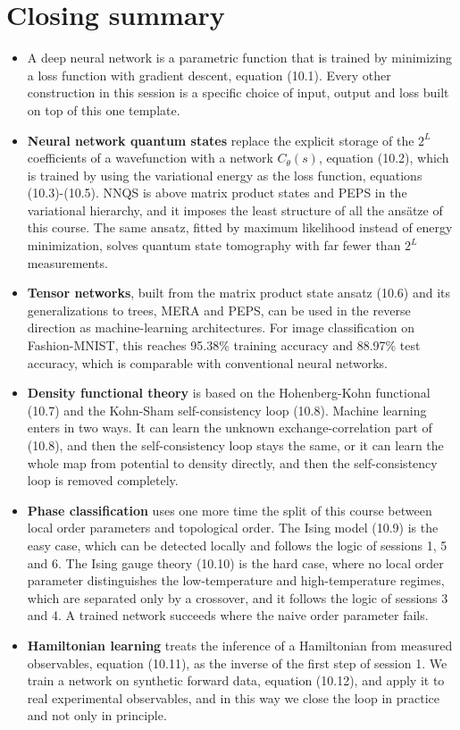 \section{Closing summary}

\begin{itemize}
\item A deep neural network is a parametric function that is trained by minimizing a loss function
  with gradient descent, equation (10.1). Every other construction in this session is a specific
  choice of input, output and loss built on top of this one template.
\item \textbf{Neural network quantum states} replace the explicit storage of the $2^L$ coefficients
  of a wavefunction with a network $C_\theta(s)$, equation (10.2), which is trained by using the
  variational energy as the loss function, equations (10.3)-(10.5). NNQS is above matrix product
  states and PEPS in the variational hierarchy, and it imposes the least structure of all the
  ans\"atze of this course. The same ansatz, fitted by maximum likelihood instead of energy
  minimization, solves quantum state tomography with far fewer than $2^L$ measurements.
\item \textbf{Tensor networks}, built from the matrix product state ansatz (10.6) and its
  generalizations to trees, MERA and PEPS, can be used in the reverse direction as
  machine-learning architectures. For image classification on Fashion-MNIST, this reaches 95.38\%
  training accuracy and 88.97\% test accuracy, which is comparable with conventional neural
  networks.
\item \textbf{Density functional theory} is based on the Hohenberg-Kohn functional (10.7) and the
  Kohn-Sham self-consistency loop (10.8). Machine learning enters in two ways. It can learn the
  unknown exchange-correlation part of (10.8), and then the self-consistency loop stays the same, or
  it can learn the whole map from potential to density directly, and then the self-consistency loop
  is removed completely.
\item \textbf{Phase classification} uses one more time the split of this course between local order
  parameters and topological order. The Ising model (10.9) is the easy case, which can be detected
  locally and follows the logic of sessions 1, 5 and 6. The Ising gauge theory (10.10) is the hard
  case, where no local order parameter distinguishes the low-temperature and high-temperature
  regimes, which are separated only by a crossover, and it follows the logic of
  sessions 3 and 4. A trained network succeeds where the naive order parameter fails.
\item \textbf{Hamiltonian learning} treats the inference of a Hamiltonian from measured observables,
  equation (10.11), as the inverse of the first step of session 1. We train a network on synthetic
  forward data, equation (10.12), and apply it to real experimental observables, and in this way we
  close the loop in practice and not only in principle.
\end{itemize}

